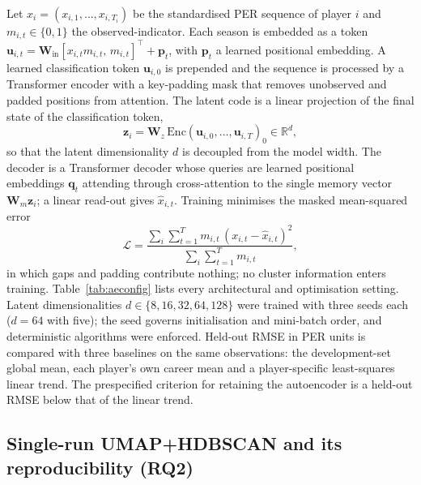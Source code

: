 Let $x_i=(x_{i,1},\dots,x_{i,T_i})$ be the standardised PER sequence of player $i$ and $m_{i,t}\in\{0,1\}$ the observed-indicator. Each season is embedded as a token $\bm{u}_{i,t}=\bm{W}_{\mathrm{in}}[x_{i,t}m_{i,t},\,m_{i,t}]^{\top}+\bm{p}_t$, with $\bm{p}_t$ a learned positional embedding. A learned classification token $\bm{u}_{i,0}$ is prepended and the sequence is processed by a Transformer encoder \citep{vaswani2017} with a key-padding mask that removes unobserved and padded positions from attention. The latent code is a linear projection of the final state of the classification token,
\begin{equation}
\bm{z}_i=\bm{W}_z\,\mathrm{Enc}(\bm{u}_{i,0},\dots,\bm{u}_{i,T})_0\in\mathbb{R}^{d},
\label{eq:latent}
\end{equation}
so that the latent dimensionality $d$ is decoupled from the model width. The decoder is a Transformer decoder whose queries are learned positional embeddings $\bm{q}_t$ attending through cross-attention to the single memory vector $\bm{W}_m\bm{z}_i$; a linear read-out gives $\hat{x}_{i,t}$. Training minimises the masked mean-squared error
\begin{equation}
\mathcal{L}=\frac{\sum_{i}\sum_{t=1}^{T} m_{i,t}\,(x_{i,t}-\hat{x}_{i,t})^{2}}{\sum_{i}\sum_{t=1}^{T} m_{i,t}},
\label{eq:loss}
\end{equation}
in which gaps and padding contribute nothing; no cluster information enters training. Table~\ref{tab:aeconfig} lists every architectural and optimisation setting. Latent dimensionalities $d\in\{8,16,32,64,128\}$ were trained with three seeds each ($d=64$ with five); the seed governs initialisation and mini-batch order, and deterministic algorithms were enforced. Held-out RMSE in PER units is compared with three baselines on the same observations: the development-set global mean, each player's own career mean and a player-specific least-squares linear trend. The prespecified criterion for retaining the autoencoder is a held-out RMSE below that of the linear trend.

\begin{table}[t]\centering\small
\caption{Transformer autoencoder: architecture, initialisation, optimisation and validation settings.}
\label{tab:aeconfig}
\resizebox{\textwidth}{!}{}
\end{table}

\subsection{Single-run UMAP+HDBSCAN and its reproducibility (RQ2)}\label{sec:singlerun}

